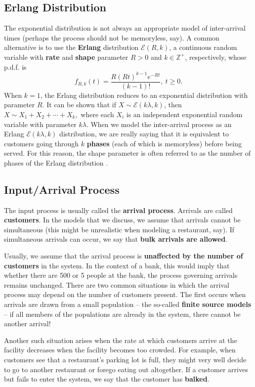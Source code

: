 \subsection{Erlang Distribution}
The exponential distribution is not always an appropriate model of inter-arrival times (perhaps the process should not be memoryless, say). A common alternative is to use the \textbf{Erlang} distribution $\mathcal{E}(R,k)$, a continuous random variable with \textbf{rate} and \textbf{shape} parameter $R>0$ and $k\in \mathbb{Z}^+$, respectively, whose p.d.f. is  
$$ f_{R,k}(t) = \frac{R (Rt)^{k-1} e^{-Rt}}{(k-1)!},\ t\geq 0.$$
When $k=1$, the Erlang distribution reduces to an exponential distribution with parameter $R$. It can be shown that if $X\sim \mathcal{E}(k\lambda,k)$, then  $X\sim X_{1}+X_{2}+\cdots+X_{k},$ where each $X_{i}$ is an independent exponential random variable with parameter $k \lambda$. \newl When we model the inter-arrival process as an Erlang $\mathcal{E}(k\lambda,k)$ distribution, we are really saying that it is equivalent to customers going through $k$ \textbf{phases} (each of which is memoryless) before being served. For this reason, the shape parameter is often referred to as the number of phases of the Erlang distribution \cite{QS_N}.
\subsection{Input/Arrival Process}
The input process is usually called the \textbf{arrival process}. Arrivals are called \textbf{customers}. In the models that we discuss, we assume that arrivals cannot be simultaneous (this might be unrealistic when modeling a restaurant, say). If simultaneous arrivals can occur, we say that \textbf{bulk arrivals are allowed}. 
\par Usually, we assume that the arrival process is \textbf{unaffected by the number of customers} in the system. In the context of a bank, this would imply that whether there are 500 or 5 people at the bank, the process governing arrivals remains unchanged.  
\newl There are two common situations in which the arrival process may depend on the number of customers present. The first occurs when arrivals are drawn from a small population -- the so-called \textbf{finite source models} -- if all members of the populations are already in the system, there cannot be another arrival!\par Another such situation arises when the rate at which customers arrive at the facility decreases when the facility becomes too crowded. For example, when customers see that a restaurant's parking lot is full, they might very well decide to go to another restaurant or forego eating out altogether. If a customer arrives but fails to enter the system, we say that the customer has \textbf{balked}.
